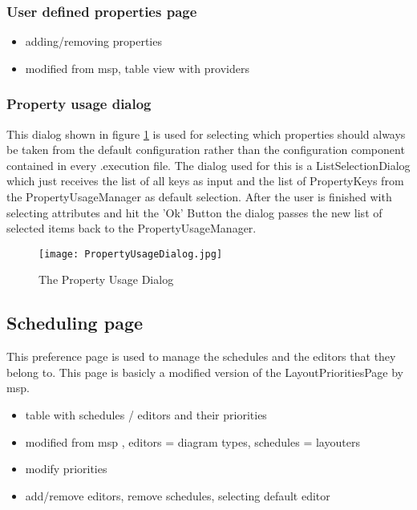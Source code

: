 \subsubsection{User defined properties page}
\begin{itemize}
 \item adding/removing properties
 \item modified from msp, table view with providers
\end{itemize}

\subsubsection{Property usage dialog}
This dialog shown in figure \ref{fig:PropertyUsageDialog} is used for selecting which properties should always be taken
from the default configuration rather than the configuration component contained
in every .execution file.
The dialog used for this is a ListSelectionDialog which just receives the list of
all keys as input and the list of PropertyKeys from the PropertyUsageManager as default selection.
After the user is finished with selecting attributes and hit the 'Ok' Button the dialog
passes the new list of selected items back to the PropertyUsageManager.
\begin{figure}[PropertyUsageDialog]
  \centering
  \texttt{[image: PropertyUsageDialog.jpg]}
  \caption[Property Usage Dialog]%
  {The Property Usage Dialog\protect\footnotemark}
  \label{fig:PropertyUsageDialog}
\end{figure}

\subsection{Scheduling page}
This preference page is used to manage the schedules and the editors that they belong to.
This page is basicly a modified version of the LayoutPrioritiesPage by msp.

\begin{itemize}
 \item table with schedules / editors and their priorities
 \item modified from msp , editors = diagram types, schedules = layouters
 \item modify priorities
 \item add/remove editors, remove schedules, selecting default editor
\end{itemize}


